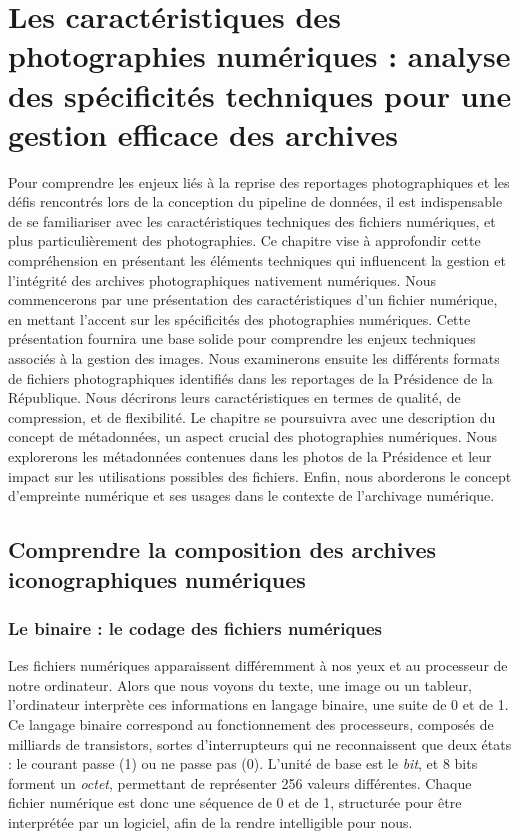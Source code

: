 \chapter{Les caractéristiques des photographies numériques : analyse des spécificités techniques pour une gestion efficace des archives}

Pour comprendre les enjeux liés à la reprise des reportages photographiques et les défis rencontrés lors de la conception du pipeline de données, il est indispensable de se familiariser avec les caractéristiques techniques des fichiers numériques, et plus particulièrement des photographies. Ce chapitre vise à approfondir cette compréhension en présentant les éléments techniques qui influencent la gestion et l'intégrité des archives photographiques nativement numériques. Nous commencerons par une présentation des caractéristiques d'un fichier numérique, en mettant l'accent sur les spécificités des photographies numériques. Cette présentation fournira une base solide pour comprendre les enjeux techniques associés à la gestion des images. Nous examinerons ensuite les différents formats de fichiers photographiques identifiés dans les reportages de la Présidence de la République. Nous décrirons leurs caractéristiques en termes de qualité, de compression, et de flexibilité. Le chapitre se poursuivra avec une description du concept de métadonnées, un aspect crucial des photographies numériques. Nous explorerons les métadonnées contenues dans les photos de la Présidence et leur impact sur les utilisations possibles des fichiers. Enfin, nous aborderons le concept d'empreinte numérique et ses usages dans le contexte de l'archivage numérique.

\section{Comprendre la composition des archives iconographiques numériques}
\subsection*{Le binaire : le codage des fichiers numériques}
Les fichiers numériques apparaissent différemment à nos yeux et au processeur de notre ordinateur. Alors que nous voyons du texte, une image ou un tableur, l'ordinateur interprète ces informations en langage binaire, une suite de 0 et de 1. Ce langage binaire correspond au fonctionnement des processeurs, composés de milliards de transistors, sortes d'interrupteurs qui ne reconnaissent que deux états : le courant passe (1) ou ne passe pas (0). L'unité de base est le \emph{bit}, et 8 bits forment un \emph{octet}, permettant de représenter 256 valeurs différentes. Chaque fichier numérique est donc une séquence de 0 et de 1, structurée pour être interprétée par un logiciel, afin de la rendre intelligible pour nous.

